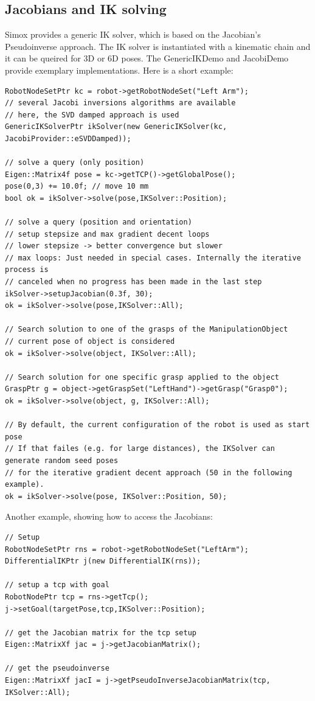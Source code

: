 \subsection{Jacobians and IK solving}
Simox provides a generic IK solver, which is based on the Jacobian's Pseudoinverse approach. The IK solver is instantiated with a kinematic chain and it can be queired for 3D or 6D poses. The GenericIKDemo and JacobiDemo provide exemplary implementations. Here is a short example:
\begin{lstlisting}
RobotNodeSetPtr kc = robot->getRobotNodeSet("Left Arm");
// several Jacobi inversions algorithms are available
// here, the SVD damped approach is used
GenericIKSolverPtr ikSolver(new GenericIKSolver(kc, JacobiProvider::eSVDDamped));

// solve a query (only position)
Eigen::Matrix4f pose = kc->getTCP()->getGlobalPose();
pose(0,3) += 10.0f; // move 10 mm
bool ok = ikSolver->solve(pose,IKSolver::Position);

// solve a query (position and orientation)
// setup stepsize and max gradient decent loops
// lower stepsize -> better convergence but slower
// max loops: Just needed in special cases. Internally the iterative process is
// canceled when no progress has been made in the last step
ikSolver->setupJacobian(0.3f, 30); 
ok = ikSolver->solve(pose,IKSolver::All);

// Search solution to one of the grasps of the ManipulationObject
// current pose of object is considered
ok = ikSolver->solve(object, IKSolver::All);

// Search solution for one specific grasp applied to the object
GraspPtr g = object->getGraspSet("LeftHand")->getGrasp("Grasp0");
ok = ikSolver->solve(object, g, IKSolver::All);

// By default, the current configuration of the robot is used as start pose
// If that failes (e.g. for large distances), the IKSolver can generate random seed poses
// for the iterative gradient decent approach (50 in the following example).
ok = ikSolver->solve(pose, IKSolver::Position, 50);
\end{lstlisting}
Another example, showing how to access the Jacobians:
\begin{lstlisting}
// Setup
RobotNodeSetPtr rns = robot->getRobotNodeSet("LeftArm");
DifferentialIKPtr j(new DifferentialIK(rns));

// setup a tcp with goal
RobotNodePtr tcp = rns->getTcp();
j->setGoal(targetPose,tcp,IKSolver::Position);

// get the Jacobian matrix for the tcp setup
Eigen::MatrixXf jac = j->getJacobianMatrix();

// get the pseudoinverse
Eigen::MatrixXf jacI = j->getPseudoInverseJacobianMatrix(tcp, IKSolver::All);
\end{lstlisting}
